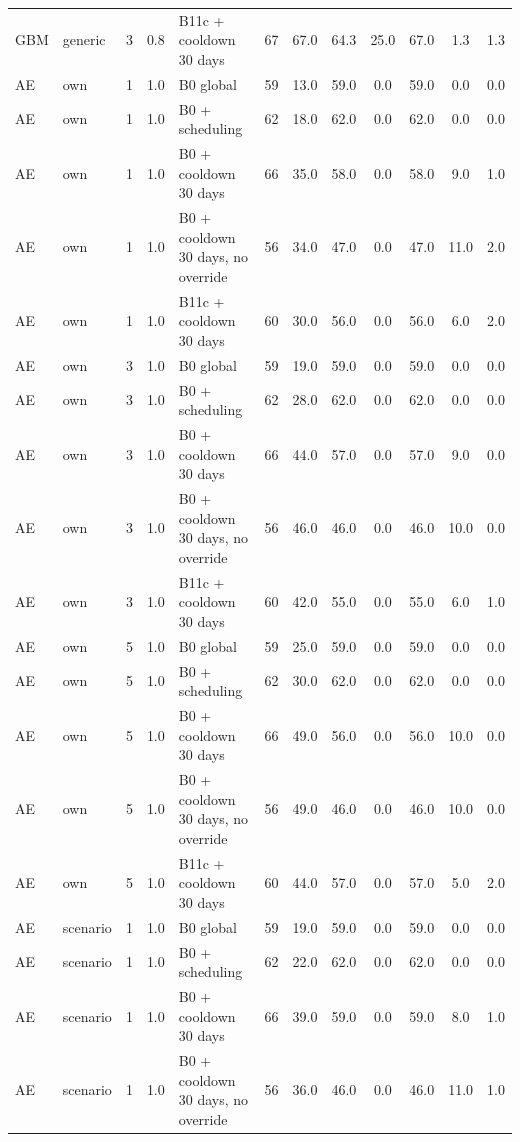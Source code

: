 \documentclass[10pt,onecolumn,letterpaper]{article}
\begin{document}
\begin{longtable}{lllllccccccc}
GBM & generic & 3 & 0.8 & B11c + cooldown 30 days & 67 & 67.0 & 64.3 & 25.0 & 67.0 & 1.3 & 1.3 \\
AE & own & 1 & 1.0 & B0 global & 59 & 13.0 & 59.0 & 0.0 & 59.0 & 0.0 & 0.0 \\
AE & own & 1 & 1.0 & B0 + scheduling & 62 & 18.0 & 62.0 & 0.0 & 62.0 & 0.0 & 0.0 \\
AE & own & 1 & 1.0 & B0 + cooldown 30 days & 66 & 35.0 & 58.0 & 0.0 & 58.0 & 9.0 & 1.0 \\
AE & own & 1 & 1.0 & B0 + cooldown 30 days, no override & 56 & 34.0 & 47.0 & 0.0 & 47.0 & 11.0 & 2.0 \\
AE & own & 1 & 1.0 & B11c + cooldown 30 days & 60 & 30.0 & 56.0 & 0.0 & 56.0 & 6.0 & 2.0 \\
AE & own & 3 & 1.0 & B0 global & 59 & 19.0 & 59.0 & 0.0 & 59.0 & 0.0 & 0.0 \\
AE & own & 3 & 1.0 & B0 + scheduling & 62 & 28.0 & 62.0 & 0.0 & 62.0 & 0.0 & 0.0 \\
AE & own & 3 & 1.0 & B0 + cooldown 30 days & 66 & 44.0 & 57.0 & 0.0 & 57.0 & 9.0 & 0.0 \\
AE & own & 3 & 1.0 & B0 + cooldown 30 days, no override & 56 & 46.0 & 46.0 & 0.0 & 46.0 & 10.0 & 0.0 \\
AE & own & 3 & 1.0 & B11c + cooldown 30 days & 60 & 42.0 & 55.0 & 0.0 & 55.0 & 6.0 & 1.0 \\
AE & own & 5 & 1.0 & B0 global & 59 & 25.0 & 59.0 & 0.0 & 59.0 & 0.0 & 0.0 \\
AE & own & 5 & 1.0 & B0 + scheduling & 62 & 30.0 & 62.0 & 0.0 & 62.0 & 0.0 & 0.0 \\
AE & own & 5 & 1.0 & B0 + cooldown 30 days & 66 & 49.0 & 56.0 & 0.0 & 56.0 & 10.0 & 0.0 \\
AE & own & 5 & 1.0 & B0 + cooldown 30 days, no override & 56 & 49.0 & 46.0 & 0.0 & 46.0 & 10.0 & 0.0 \\
AE & own & 5 & 1.0 & B11c + cooldown 30 days & 60 & 44.0 & 57.0 & 0.0 & 57.0 & 5.0 & 2.0 \\
AE & scenario & 1 & 1.0 & B0 global & 59 & 19.0 & 59.0 & 0.0 & 59.0 & 0.0 & 0.0 \\
AE & scenario & 1 & 1.0 & B0 + scheduling & 62 & 22.0 & 62.0 & 0.0 & 62.0 & 0.0 & 0.0 \\
AE & scenario & 1 & 1.0 & B0 + cooldown 30 days & 66 & 39.0 & 59.0 & 0.0 & 59.0 & 8.0 & 1.0 \\
AE & scenario & 1 & 1.0 & B0 + cooldown 30 days, no override & 56 & 36.0 & 46.0 & 0.0 & 46.0 & 11.0 & 1.0 \\

\end{longtable}
\end{document}

